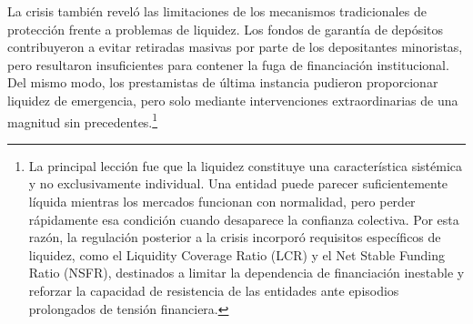 \documentclass[10pt,a4paper]{article}
\begin{document}
La crisis también reveló las limitaciones de los mecanismos tradicionales de protección frente a problemas de liquidez. Los fondos de garantía de depósitos contribuyeron a evitar retiradas masivas por parte de los depositantes minoristas, pero resultaron insuficientes para contener la fuga de financiación institucional. Del mismo modo, los prestamistas de última instancia pudieron proporcionar liquidez de emergencia, pero solo mediante intervenciones extraordinarias de una magnitud sin precedentes.\footnote{%
    La principal lección fue que la liquidez constituye una característica sistémica y no exclusivamente individual. Una entidad puede parecer suficientemente líquida mientras los mercados funcionan con normalidad, pero perder rápidamente esa condición cuando desaparece la confianza colectiva. Por esta razón, la regulación posterior a la crisis incorporó requisitos específicos de liquidez, como el Liquidity Coverage Ratio (LCR) y el Net Stable Funding Ratio (NSFR), destinados a limitar la dependencia de financiación inestable y reforzar la capacidad de resistencia de las entidades ante episodios prolongados de tensión financiera.
}
\end{document}
